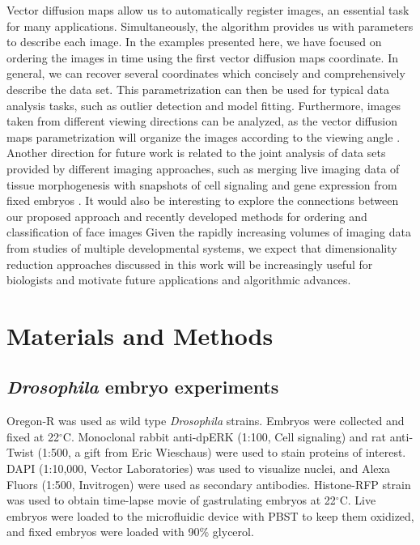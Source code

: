 \documentclass[twocolumn, 10pt]{article}
\begin{document}
%
Vector diffusion maps allow us to automatically register images, an essential task for many applications.
%
Simultaneously, the algorithm provides us with parameters to describe each image.
%
In the examples presented here, we have focused on ordering the images in time using the first vector diffusion maps coordinate.
%
In general, we can recover several coordinates which concisely and comprehensively describe the data set.
%
This parametrization can then be used for typical data analysis tasks, such as outlier detection and model fitting.
%
%
Furthermore, images taken from different viewing directions can be analyzed, as the vector diffusion maps parametrization will organize the images according to the viewing angle \citep{singer2011viewing}.
%
Another direction for future work is related to the joint analysis of data sets provided by different imaging approaches, such as merging live imaging data of tissue morphogenesis with snapshots of cell signaling and gene expression from fixed embryos \citep{krzic2012multiview, ichikawa2014live, rubel2010coupling, dsilva2013nonlinear}.
%
It would also be interesting to explore the connections between our proposed approach and recently developed methods for ordering and classification of face images \citep{kemelmacher2011exploring, kemelmacher2014illumination}
%
Given the rapidly increasing volumes of imaging data from studies of multiple developmental systems, we expect that dimensionality reduction approaches discussed in this work will be increasingly useful for biologists and motivate future applications and algorithmic advances.






\section*{Materials and Methods}

\subsection*{{\em Drosophila} embryo experiments}
%
Oregon-R was used as wild type {\em Drosophila} strains.
%
Embryos were collected and fixed at 22$^\circ$C.
%
Monoclonal rabbit anti-dpERK (1:100, Cell signaling) and rat anti-Twist (1:500, a gift from Eric Wieschaus) were used to stain proteins of interest.
%
DAPI (1:10,000, Vector Laboratories) was used to visualize nuclei, and Alexa Fluors (1:500, Invitrogen) were used as secondary antibodies.
%
Histone-RFP strain was used to obtain time-lapse movie of gastrulating embryos at 22$^\circ$C.
%
Live embryos were loaded to the microfluidic device with PBST to keep them oxidized, and fixed embryos were loaded with 90\% glycerol.
\end{document}
